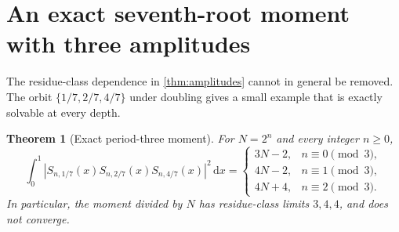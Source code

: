 \documentclass[11pt,a4paper]{article}
\numberwithin{equation}{section}
\newtheorem{theorem}{Theorem}[section]
\theoremstyle{definition}
\theoremstyle{remark}
\newcommand{\dd}{\,\mathrm d}
\begin{document}
\section{An exact seventh-root moment with three amplitudes}
\label{sec:seventh}
The residue-class dependence in \cref{thm:amplitudes} cannot in general
be removed. The orbit $\{1/7,2/7,4/7\}$ under doubling gives a small
example that is exactly solvable at every depth.

\begin{theorem}[Exact period-three moment]
\label{thm:seventh}
For $N=2^n$ and every integer $n\ge0$,
\begin{equation}
 \boxed{\quad
 \int_0^1|S_{n,1/7}(x)S_{n,2/7}(x)S_{n,4/7}(x)|^2\dd x
 =\begin{cases}
       3N-2,&n\equiv0\pmod3,\\
       4N-2,&n\equiv1\pmod3,\\
       4N+4,&n\equiv2\pmod3.
   \end{cases}
 \quad}
 \label{eq:seventh-exact}
\end{equation}
In particular, the moment divided by $N$ has residue-class
limits $3,4,4$, and does not converge.
\end{theorem}
\end{document}
